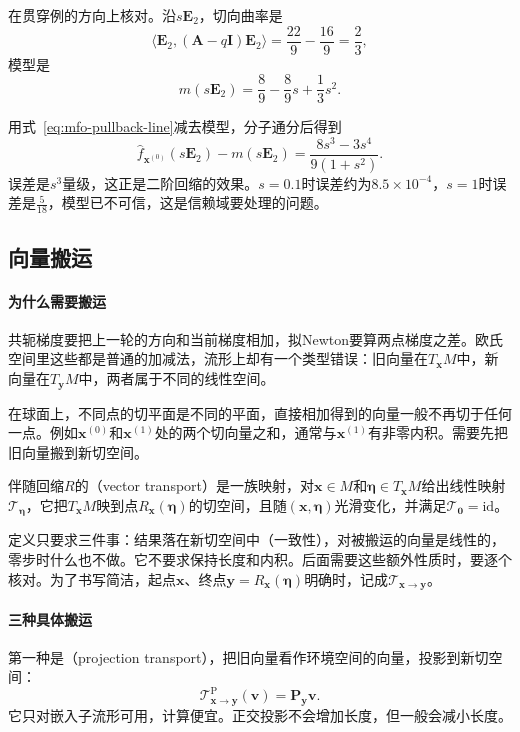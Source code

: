 在贯穿例的方向上核对。沿$s\bm{E}_2$，切向曲率是
\[
 \langle\bm{E}_2,(\bm{A}-q\bm{I})\bm{E}_2\rangle=\frac{22}{9}-\frac{16}{9}=\frac23,
\]
模型是
\[
 m(s\bm{E}_2)=\frac89-\frac89s+\frac13s^2.
\]

用式~\eqref{eq:mfo-pullback-line}减去模型，分子通分后得到
\[
 \hat{f}_{\bm{x}^{(0)}}(s\bm{E}_2)-m(s\bm{E}_2)=\frac{8s^3-3s^4}{9(1+s^2)}.
\]
误差是$s^3$量级，这正是二阶回缩的效果。$s=0.1$时误差约为$8.5\times10^{-4}$，$s=1$时误差是$\tfrac{5}{18}$，模型已不可信，这是信赖域要处理的问题。

\subsection{向量搬运}
\label{sec:mfo-transport}

\paragraph{为什么需要搬运}
共轭梯度要把上一轮的方向和当前梯度相加，拟Newton要算两点梯度之差。欧氏空间里这些都是普通的加减法，流形上却有一个类型错误：旧向量在$T_{\bm{x}}M$中，新向量在$T_{\bm{y}}M$中，两者属于不同的线性空间。

在球面上，不同点的切平面是不同的平面，直接相加得到的向量一般不再切于任何一点。例如$\bm{x}^{(0)}$和$\bm{x}^{(1)}$处的两个切向量之和，通常与$\bm{x}^{(1)}$有非零内积。需要先把旧向量搬到新切空间。

\begin{definition}[向量搬运]
 \label{def:mfo-vector-transport}
 伴随回缩$R$的（vector transport）是一族映射，对$\bm{x}\in M$和$\bm{\eta}\in T_{\bm{x}}M$给出线性映射$\mathcal{T}_{\bm{\eta}}$，它把$T_{\bm{x}}M$映到点$R_{\bm{x}}(\bm{\eta})$的切空间，且随$(\bm{x},\bm{\eta})$光滑变化，并满足$\mathcal{T}_{\bm{0}}=\mathrm{id}$。
\end{definition}

定义只要求三件事：结果落在新切空间中（一致性），对被搬运的向量是线性的，零步时什么也不做。它不要求保持长度和内积。后面需要这些额外性质时，要逐个核对。为了书写简洁，起点$\bm{x}$、终点$\bm{y}=R_{\bm{x}}(\bm{\eta})$明确时，记成$\mathcal{T}_{\bm{x}\to\bm{y}}$。

\paragraph{三种具体搬运}
第一种是（projection transport），把旧向量看作环境空间的向量，投影到新切空间：
\begin{equation}
 \mathcal{T}^{\mathrm{P}}_{\bm{x}\to\bm{y}}(\bm{v})=\bm{P}_{\bm{y}}\bm{v}.
 \label{eq:mfo-projection-transport}
\end{equation}
它只对嵌入子流形可用，计算便宜。正交投影不会增加长度，但一般会减小长度。

